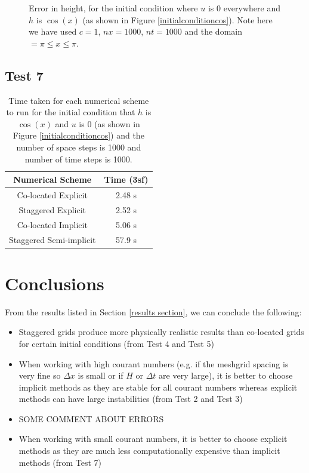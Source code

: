 \documentclass[a4paper,12pt, notitlepage]{article}
\begin{document}
{\begin{figure} [H]
\begin{minipage}{.5\textwidth}
		\caption{\label{error_height} Error in height, for the initial condition where $u$ is 0 everywhere and $h$ is $\cos(x)$ (as shown in Figure \ref{initialconditioncos}). Note here we have used $c = 1$, $nx = 1000$, $nt = 1000$ and the domain $=\pi\leq x \leq \pi$.} 
	\end{minipage}
\end{figure}



\subsection{Test 7}

\begin{table}[H]
	\centering
	\begin{tabular}{|c | c|} 
		\hline
		\textbf{Numerical Scheme} & \textbf{Time (3sf)}  \\
		\hline
		Co-located Explicit & 2.48 s \\ 
		\hline
	    Staggered Explicit & 2.52 s \\
		\hline
		Co-located  Implicit & 5.06 s \\
		\hline
		Staggered Semi-implicit & 57.9 s \\
		\hline
	\end{tabular}
\caption{Time taken for each numerical scheme to run for the initial condition that $h$ is $\cos(x)$ and $u$ is $0$ (as shown in Figure \ref{initialconditioncos}) and the number of space steps is 1000 and number of time steps is 1000.}
\label{timingtable}
\end{table}

\section{Conclusions}

From the results listed in Section \ref{results section}, we can conclude the following:

\begin{itemize}
	\item Staggered grids produce more physically realistic results than co-located grids for certain initial conditions (from Test 4 and Test 5)
	\item When working with high courant numbers (e.g. if the meshgrid spacing is very fine so $\Delta x$ is small or if $H$ or $\Delta t$ are very large), it is better to choose implicit methods as they are stable for all courant numbers whereas explicit methods can have large instabilities (from Test 2 and Test 3)
	\item SOME COMMENT ABOUT ERRORS
	\item When working with small courant numbers, it is better to choose explicit methods as they are much less computationally expensive than implicit methods (from Test 7)
\end{itemize}

}
\end{document}
